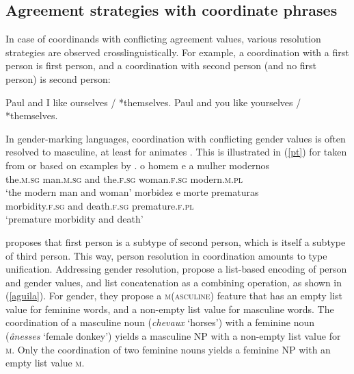 \subsection{Agreement strategies with coordinate phrases}


In case of coordinands with conflicting agreement values, various resolution strategies are observed 
crosslinguistically. For example, a coordination with a first person is first person, and a coordination with second person (and no first person) is second person:

\eal
\ex Paul and I like ourselves / *themselves.
\ex Paul and you like yourselves / *themselves.
\zl

In gender-marking languages, coordination with conflicting gender values is often resolved to 
masculine, at least for animates \citep[186]{Corbet91}. This is illustrated in (\ref{pt}) for  taken from or based on examples by \citet*{Villavicencio:Sadler:ea:05}.
\eal
\label{pt}
\ex 
\gll o homem e a mulher modernos\footnotemark\\
     the.\textsc{m.sg} man.\textsc{m.sg} and the.\textsc{f.sg} woman.\textsc{f.sg} modern.\textsc{m.pl} \\
\glt `the modern man and woman'
\ex 
\gll morbidez e morte prematuras\footnotemark\\
     morbidity.\textsc{f.sg} and death.\textsc{f.sg} premature.\textsc{f.pl}\\
\glt `premature morbidity and death'\\
\zl


\citet[]{Sag:03} proposes that first person is a subtype of second person, which is itself a subtype of third person. This way, person resolution in coordination amounts to type unification. Addressing gender resolution, \citet{Aguila:Crysmann:18} propose a list-based encoding of person and gender values, and list concatenation as a combining operation, as shown in (\ref{aguila}). For gender, they propose a \textsc{m}(\textsc{asculine}) feature that has an empty list value for feminine words, and a non-empty list value for masculine words.  The coordination of a masculine noun (\emph{chevaux} `horses') with a feminine noun (\emph{\^{a}nesses} `female donkey')  yields a masculine NP with a non-empty list value for \textsc{m}. Only the coordination of two feminine nouns yields a feminine NP with an empty list value \textsc{m}.
 

